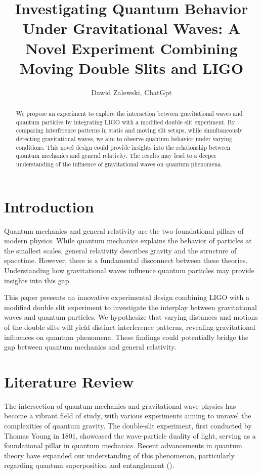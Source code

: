 \documentclass{article}
\title{Investigating Quantum Behavior Under Gravitational Waves: A Novel Experiment Combining Moving Double Slits and LIGO
}
\author{Dawid Zalewski, ChatGpt}
\begin{document}
\maketitle

\begin{abstract}
We propose an experiment to explore the interaction between gravitational waves and quantum particles by integrating LIGO with a modified double slit experiment. By comparing interference patterns in static and moving slit setups, while simultaneously detecting gravitational waves, we aim to observe quantum behavior under varying conditions. This novel design could provide insights into the relationship between quantum mechanics and general relativity. The results may lead to a deeper understanding of the influence of gravitational waves on quantum phenomena.
\end{abstract}

\section{Introduction}
Quantum mechanics and general relativity are the two foundational pillars of modern physics. While quantum mechanics explains the behavior of particles at the smallest scales, general relativity describes gravity and the structure of spacetime. However, there is a fundamental disconnect between these theories. Understanding how gravitational waves influence quantum particles may provide insights into this gap.

This paper presents an innovative experimental design combining LIGO with a modified double slit experiment to investigate the interplay between gravitational waves and quantum particles. We hypothesize that varying distances and motions of the double slits will yield distinct interference patterns, revealing gravitational influences on quantum phenomena. These findings could potentially bridge the gap between quantum mechanics and general relativity.

\section{Literature Review}
The intersection of quantum mechanics and gravitational wave physics has become a vibrant field of study, with various experiments aiming to unravel the complexities of quantum gravity. The double-slit experiment, first conducted by Thomas Young in 1801, showcased the wave-particle duality of light, serving as a foundational pillar in quantum mechanics. Recent advancements in quantum theory have expanded our understanding of this phenomenon, particularly regarding quantum superposition and entanglement (\cite{nielsen2010}).
\end{document}
